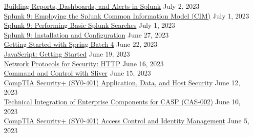 \documentclass[10pt]{res} %
\begin{document}
\begin{resume}
\href{https://bjdelacruz.dev/files/certificates/pluralsight/Building_Reports_Dashboards_and_Alerts_in_Splunk.pdf}{\color{blue}Building Reports, Dashboards, and Alerts in Splunk} \hfill July 2, 2023 \\
\href{https://bjdelacruz.dev/files/certificates/pluralsight/4_Splunk_9_Employing_the_Splunk_Common_Information_Model_CIM.pdf}{\color{blue}Splunk 9: Employing the Splunk Common Information Model (CIM)} \hfill July 1, 2023 \\
\href{https://bjdelacruz.dev/files/certificates/pluralsight/2_Splunk_9_Performing_Basic_Splunk_Searches.pdf}{\color{blue}Splunk 9: Performing Basic Splunk Searches} \hfill July 1, 2023 \\
\href{https://bjdelacruz.dev/files/certificates/pluralsight/1_Splunk_9_Installation_and_Configuration.pdf}{\color{blue}Splunk 9: Installation and Configuration} \hfill June 27, 2023 \\
\href{https://bjdelacruz.dev/files/certificates/pluralsight/Getting_Started_with_Spring_Batch_4.pdf}{\color{blue}Getting Started with Spring Batch 4} \hfill June 22, 2023 \\
\href{https://bjdelacruz.dev/files/certificates/pluralsight/JavaScript_Getting_Started.pdf}{\color{blue}JavaScript: Getting Started} \hfill June 19, 2023 \\
\href{https://bjdelacruz.dev/files/certificates/pluralsight/6_Network_Protocols_for_Security_HTTP.pdf}{\color{blue}Network Protocols for Security: HTTP} \hfill June 16, 2023 \\
\href{https://bjdelacruz.dev/files/certificates/pluralsight/Command_and_Control_with_Sliver.pdf}{\color{blue}Command and Control with Sliver} \hfill June 15, 2023 \\
\href{https://bjdelacruz.dev/files/certificates/pluralsight/CompTIA_Security_SY0_401_Application_Data_and_Host_Security.pdf}{\color{blue}CompTIA Security+ (SY0-401) Application, Data, and Host Security} \hfill June 12, 2023 \\
\href{https://bjdelacruz.dev/files/certificates/pluralsight/Technical_Integration_of_Enterprise_Components_for_CASP_CAS_002.pdf}{\color{blue}Technical Integration of Enterprise Components for CASP (CAS-002)} \hfill June 10, 2023 \\
\href{https://bjdelacruz.dev/files/certificates/pluralsight/CompTIA_Security_SY0_401_Access_Control_and_Identity_Management.pdf}{\color{blue}CompTIA Security+ (SY0-401) Access Control and Identity Management} \hfill June 5, 2023 \\

\end{resume}
\end{document}
